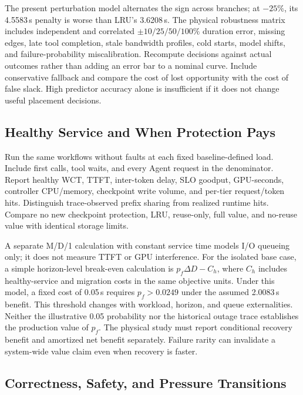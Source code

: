 \documentclass[sigplan,10pt,anonymous,nonacm]{acmart}
\begin{document}
The present perturbation model alternates the sign across branches;
at $-25\%$, its 4.5583\,s penalty is worse than LRU's 3.6208\,s.
The physical robustness matrix includes independent and correlated
$\pm10/25/50/100\%$ duration error, missing edges, late tool completion,
stale bandwidth profiles, cold starts, model shifts, and failure-probability
miscalibration. Recompute decisions against actual outcomes rather than
adding an error bar to a nominal curve. Include conservative fallback
and compare the cost of lost opportunity with the cost of false slack.
High predictor accuracy alone is insufficient if it does not change
useful placement decisions.

\FloatBarrier
\subsection{Healthy Service and When Protection Pays}

Run the same workflows without faults at each fixed baseline-defined
load. Include first calls, tool waits, and every Agent request in the
denominator. Report healthy WCT, TTFT, inter-token delay, SLO goodput,
GPU-seconds, controller CPU/memory, checkpoint write volume, and per-tier
request/token hits. Distinguish trace-observed prefix sharing from
realized runtime hits. Compare no new checkpoint protection, LRU,
reuse-only, full value, and no-reuse value with identical storage limits.

A separate M/D/1 calculation with constant service time models I/O queueing only; it does not measure TTFT or GPU interference. For the isolated base case, a simple horizon-level
break-even calculation is $p_f\Delta D-C_h$, where $C_h$ includes
healthy-service and migration costs in the same objective units.
Under this model, a fixed cost of 0.05\,s
requires $p_f>0.0249$ under the assumed 2.0083\,s benefit. This threshold
changes with workload, horizon, and queue externalities. Neither the
illustrative 0.05 probability nor the historical outage trace establishes
the production value of $p_f$. The physical study must report conditional
recovery benefit and amortized net benefit separately. Failure rarity
can invalidate a system-wide value claim even when recovery is faster.

\FloatBarrier
\subsection{Correctness, Safety, and Pressure Transitions}
\end{document}
